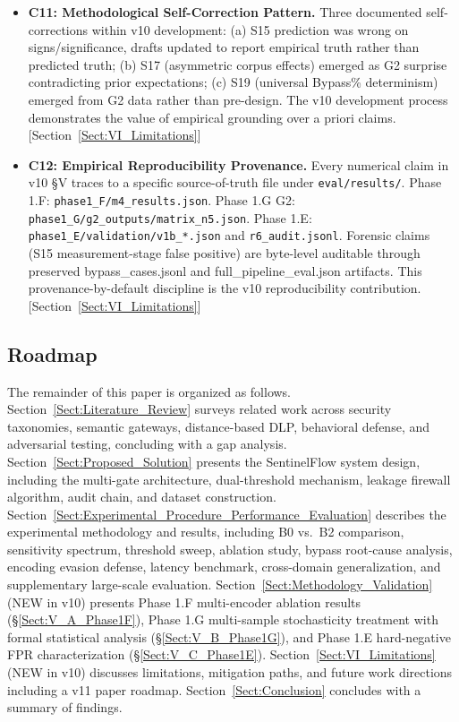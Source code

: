 \documentclass[journal]{IEEEtran}
\begin{document}
\begin{itemize}
    \item \textbf{C11: Methodological Self-Correction Pattern.}
    Three documented self-corrections within v10 development: (a) S15 prediction was wrong on signs/significance, drafts updated to report empirical truth rather than predicted truth; (b) S17 (asymmetric corpus effects) emerged as G2 surprise contradicting prior expectations; (c) S19 (universal Bypass\% determinism) emerged from G2 data rather than pre-design. The v10 development process demonstrates the value of empirical grounding over a priori claims. [Section~\ref{Sect:VI_Limitations}]

    \item \textbf{C12: Empirical Reproducibility Provenance.}
    Every numerical claim in v10 \S V traces to a specific source-of-truth file under \texttt{eval/results/}. Phase 1.F: \texttt{phase1\_F/m4\_results.json}. Phase 1.G G2: \texttt{phase1\_G/g2\_outputs/matrix\_n5.json}. Phase 1.E: \texttt{phase1\_E/validation/v1b\_*.json} and \texttt{r6\_audit.jsonl}. Forensic claims (S15 measurement-stage false positive) are byte-level auditable through preserved bypass\_cases.jsonl and full\_pipeline\_eval.json artifacts. This provenance-by-default discipline is the v10 reproducibility contribution. [Section~\ref{Sect:VI_Limitations}]
\end{itemize}


\subsection{Roadmap}
\label{Sect:Roadmap}

The remainder of this paper is organized as follows. Section~\ref{Sect:Literature_Review} surveys related work across security taxonomies, semantic gateways, distance-based DLP, behavioral defense, and adversarial testing, concluding with a gap analysis. Section~\ref{Sect:Proposed_Solution} presents the SentinelFlow system design, including the multi-gate architecture, dual-threshold mechanism, leakage firewall algorithm, audit chain, and dataset construction. Section~\ref{Sect:Experimental_Procedure_Performance_Evaluation} describes the experimental methodology and results, including B0 vs.\ B2 comparison, sensitivity spectrum, threshold sweep, ablation study, bypass root-cause analysis, encoding evasion defense, latency benchmark, cross-domain generalization, and supplementary large-scale evaluation. Section~\ref{Sect:Methodology_Validation} (NEW in v10) presents Phase 1.F multi-encoder ablation results (\S\ref{Sect:V_A_Phase1F}), Phase 1.G multi-sample stochasticity treatment with formal statistical analysis (\S\ref{Sect:V_B_Phase1G}), and Phase 1.E hard-negative FPR characterization (\S\ref{Sect:V_C_Phase1E}). Section~\ref{Sect:VI_Limitations} (NEW in v10) discusses limitations, mitigation paths, and future work directions including a v11 paper roadmap. Section~\ref{Sect:Conclusion} concludes with a summary of findings.
\end{document}
